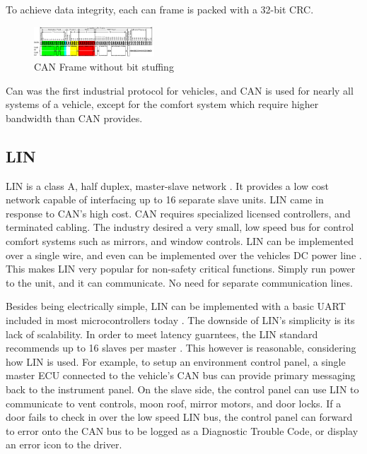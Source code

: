 \documentclass[conference,12pt]{IEEEtran}
\begin{document}
To achieve data integrity, each can frame is packed with a 32-bit CRC. 

\begin{figure}
  \centering
  \includegraphics[width=0.4\textwidth]{can_frame.pdf}
  \caption{CAN Frame without bit stuffing}
  \label{fig:can_frame}
\end{figure}

Can was the first industrial protocol for vehicles, and CAN is used for nearly
all systems of a vehicle, except for the comfort system which require higher
bandwidth than CAN provides.

\subsection{LIN}
LIN is a class A, half duplex, master-slave network \autocite{std_lin}. It provides a low
cost network capable of interfacing up to 16 separate slave units. LIN came in
response to CAN's high cost. CAN requires specialized licensed controllers,
and terminated cabling.  The industry desired a very small, low speed bus for
control comfort systems such as mirrors, and window controls. LIN can be
implemented over a single wire, and even can be implemented over the vehicles DC
power line \autocite{elmenreich_comparison_2005}.  This makes LIN very popular
for non-safety critical functions. Simply run power to the unit, and it can
communicate. No need for separate communication lines.  
    
Besides being electrically simple, LIN can be implemented with a basic UART
included in most microcontrollers today \autocite{elmenreich_comparison_2005}.
The downside of LIN's simplicity is its lack of scalability. In order to meet
latency guarntees, the LIN standard recommends up to 16 slaves per master
\autocite{std_lin}.  This however is reasonable, considering how LIN is used.
For example, to setup an environment control panel, a single master ECU
connected to the vehicle's CAN bus can provide primary messaging back to the
instrument panel.  On the slave side, the control panel can use LIN to
communicate to vent controls, moon roof, mirror motors, and door locks. If
a door fails to check in over the low speed LIN bus, the control panel can
forward to error onto the CAN bus to be logged as a Diagnostic Trouble Code, or
display an error icon to the driver. 
    
\end{document}
